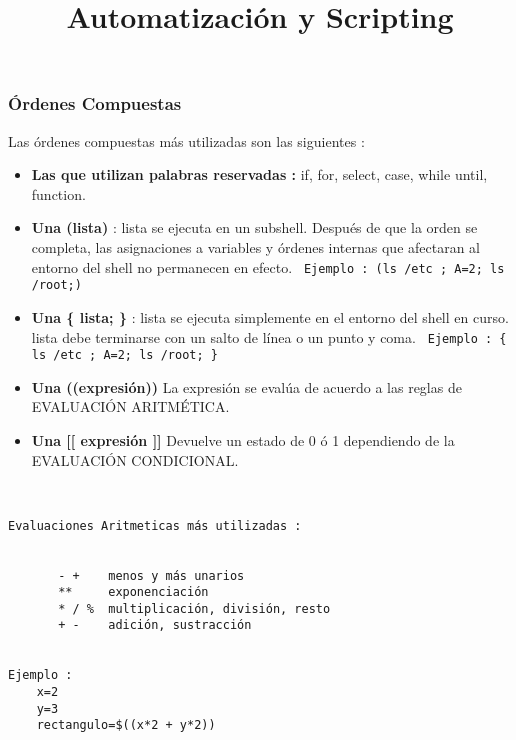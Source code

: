 \documentclass{beamer}
\title{Automatización y Scripting}
\begin{document}
\begin{frame}
  \titlepage

\end{frame}






\begin{frame}{}
\frametitle{Órdenes Compuestas}
Las órdenes compuestas más utilizadas son las siguientes :
\begin{itemize}
\item \textbf{Las que utilizan palabras reservadas : } if, for, select, case, while until, function.
\item \textbf{Una (lista) }: lista  se  ejecuta  en  un subshell. Después de que la orden se completa, las asignaciones a variables y órdenes internas que afectaran al
              entorno del shell no permanecen en efecto.
\texttt{ Ejemplo :  (ls /etc ; A=2; ls /root;) }
\item \textbf{Una \{ lista; \} }: 
              lista se ejecuta simplemente en el entorno del shell en curso.  lista debe terminarse con un salto de línea o un punto y  coma.
\texttt{ Ejemplo :  \{ ls /etc ; A=2; ls /root; \} }
\item
\textbf{Una ((expresión)) } La expresión se evalúa de acuerdo a las reglas de EVALUACIÓN ARITMÉTICA.  
\item
\textbf{Una [[ expresión ]] } Devuelve un estado de 0 ó 1 dependiendo de la EVALUACIÓN CONDICIONAL. 
\end{itemize}
\end{frame}{}



\begin{Verbatim}


Evaluaciones Aritmeticas más utilizadas :


       - +    menos y más unarios
       **     exponenciación
       * / %  multiplicación, división, resto
       + -    adición, sustracción


Ejemplo :
	x=2
	y=3
	rectangulo=$((x*2 + y*2))
\end{Verbatim}
\end{document}
